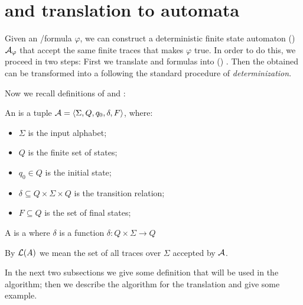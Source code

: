%
%


\section{\LTLf and \LDLf translation to automata}\label{sect:llf2automata}
Given an \LTLf/\LDLf formula $\varphi$,
we can construct a deterministic finite state automaton (\DFA) \citep{Rabin:1959:FAD:1661907.1661909} 
$\mathcal{A}_\varphi$ that accept the same finite traces that makes $\varphi$ true. In order to do this, we proceed in two steps:
First we translate \LTLf and \LDLf formulas into (\NFA) \citep{DeGiacomo:2015:SLL:2832415.2832466}. Then the \NFA obtained can be transformed into a \DFA following the standard procedure of \emph{determinization}.

Now we recall definitions of \NFA and \DFA:
\begin{definition}\label{nfa}
	An \NFA is a tuple $\mathcal{A} = \langle \Sigma, Q, q_0 , \delta, F \rangle$, where:
	\begin{itemize}
		\item $\Sigma$ is the input alphabet;
		\item $Q$ is the finite set of states;
		\item $q_0 \in Q$ is the initial state;
		\item $\delta \subseteq Q \times \Sigma \times Q$ is the
		transition relation;
		\item $F \subseteq Q$ is the set of final states;
	\end{itemize}
\end{definition}
\begin{definition}
	A \DFA is a \NFA where $\delta$ is a function $\delta: Q \times \Sigma \to Q$
\end{definition}
By $\mathcal{L}(A)$ we mean the set of all traces over $\Sigma$ accepted by $\mathcal{A}$.

In the next two subsections we give some definition that will be used in the algorithm; then we describe the algorithm for the translation and give some example.

